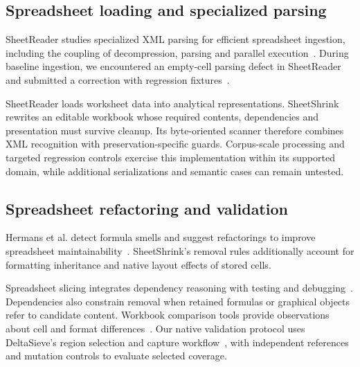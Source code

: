 \subsection{Spreadsheet loading and specialized parsing}
SheetReader studies specialized XML parsing for efficient spreadsheet ingestion,
including the coupling of decompression, parsing and parallel
execution~\cite{sheetreader}.
During baseline
ingestion, we encountered an empty-cell parsing defect in SheetReader and
submitted a correction with regression fixtures~\cite{sheetreaderparserfix}.

SheetReader loads worksheet data into analytical representations. SheetShrink
rewrites an editable workbook whose required contents, dependencies and
presentation must survive cleanup. Its byte-oriented scanner therefore combines
XML recognition with preservation-specific guards. Corpus-scale processing and
targeted regression controls exercise this implementation within its supported
domain, while additional serializations and semantic cases can remain untested.

\subsection{Spreadsheet refactoring and validation}
Hermans et al. detect formula smells and suggest refactorings to improve
spreadsheet maintainability~\cite{formulasmells}. SheetShrink's removal rules
additionally
account for formatting inheritance and native layout effects of stored cells.

Spreadsheet slicing integrates dependency reasoning with testing and
debugging~\cite{slicing}. Dependencies also constrain removal when retained
formulas or graphical objects refer to candidate content. Workbook comparison
tools provide observations about cell and format differences~\cite{spreadsheetcompare}.
Our native validation protocol uses DeltaSieve's region selection and capture
workflow~\cite{deltasievecompanion}, with independent references and mutation
controls to evaluate selected coverage.
